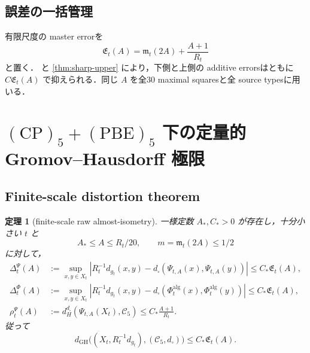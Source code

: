 \documentclass[a4paper,11pt]{ltjsarticle}
\numberwithin{equation}{section}
\theoremstyle{plain}
\newtheorem{theorem}{定理}[section]
\theoremstyle{definition}
\theoremstyle{remark}
\newcommand{\cC}{\mathcal C}
\newcommand{\GH}{\mathrm{GH}}
\begin{document}
\subsection{誤差の一括管理}

有限尺度の master errorを
\begin{equation}\label{eq:master-error}
 \mathfrak E_t(A)=\mathfrak m_t(2A)+\frac{A+1}{R_t}
\end{equation}
と置く． と \cref{thm:sharp-upper} により，下側と上側の additive errorsはともに
$C\mathfrak E_t(A)$ で抑えられる．同じ $A$ を全30 maximal squaresと全 source typesに用いる．

\section{$\mathrm{(CP)}_5+\mathrm{(PBE)}_5$ 下の定量的 Gromov--Hausdorff 極限}\label{sec:exact-GH}

\subsection{Finite-scale distortion theorem}

\begin{theorem}[finite-scale raw almost-isometry]\label{thm:finite-scale-distortion}
一様定数 $A_*,C_*>0$ が存在し，十分小さい $t$ と
\[
 A_*\le A\le R_t/20,
 \qquad m=\mathfrak m_t(2A)\le1/2
\]
に対して，
\begin{align}
 \Delta_t^\Psi(A)
 &:={\sup}_{x,y\in X_t}
 \left|R_t^{-1}d_{g_t}(x,y)
 -d_\square(\Psi_{t,A}(x),\Psi_{t,A}(y))\right|
 \le C_*\mathfrak E_t(A),
 \label{eq:finite-distortion-Psi}\\
 \Delta_t^\Phi(A)
 &:={\sup}_{x,y\in X_t}
 \left|R_t^{-1}d_{g_t}(x,y)
 -d_\square(\Phi_t^{\mathrm{alg}}(x),\Phi_t^{\mathrm{alg}}(y))\right|
 \le C_*\mathfrak E_t(A),
 \label{eq:finite-distortion-Phi}\\
 \rho_t^\Psi(A)
 &:=d_H^{d_\square}(\Psi_{t,A}(X_t),\cC_5)
 \le C_*\frac{A+1}{R_t}.
 \label{eq:finite-density-Psi}
\end{align}
従って
\begin{equation}\label{eq:finite-GH-bound}
 d_{\GH}\bigl((X_t,R_t^{-1}d_{g_t}),(\cC_5,d_\square)\bigr)
 \le C_*\mathfrak E_t(A).
\end{equation}
\end{theorem}
\end{document}
